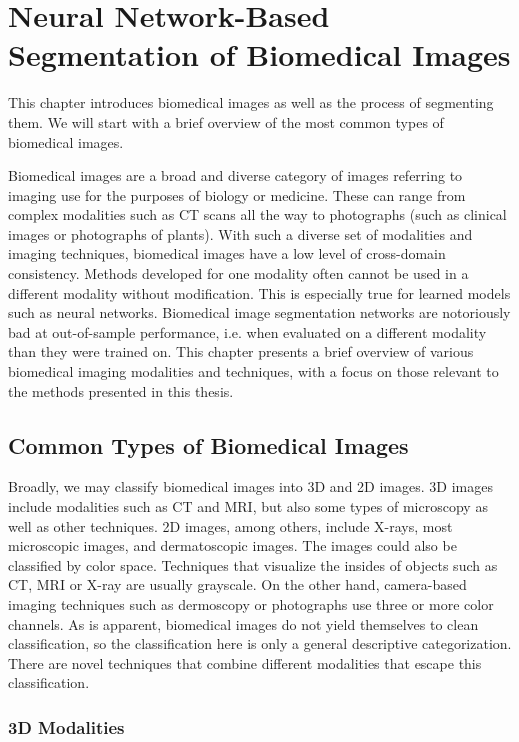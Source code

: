 \chapter{Neural Network-Based Segmentation of Biomedical Images}
\label{chap:seg-background}

This chapter introduces biomedical images as well as the process of segmenting them. We will start with a brief overview of the most common types of biomedical images.

Biomedical images are a broad and diverse category of images referring to imaging use for the purposes of biology or medicine. These can range from complex modalities such as CT scans all the way to photographs (such as clinical images or photographs of plants). With such a diverse set of modalities and imaging techniques, biomedical images have a low level of cross-domain consistency. Methods developed for one modality often cannot be used in a different modality without modification. This is especially true for learned models such as neural networks. Biomedical image segmentation networks are notoriously bad at out-of-sample performance, i.e. when evaluated on a different modality than they were trained on. This chapter presents a brief overview of various biomedical imaging modalities and techniques, with a focus on those relevant to the methods presented in this thesis.

\section{Common Types of Biomedical Images}

Broadly, we may classify biomedical images into 3D and 2D images. 3D images include modalities such as CT and MRI, but also some types of microscopy as well as other techniques. 2D images, among others, include X-rays, most microscopic images, and dermatoscopic images. The images could also be classified by color space. Techniques that visualize the insides of objects such as CT, MRI or X-ray are usually grayscale. On the other hand, camera-based imaging techniques such as dermoscopy or photographs use three or more color channels. As is apparent, biomedical images do not yield themselves to clean classification, so the classification here is only a general descriptive categorization. There are novel techniques that combine different modalities that escape this classification.

\subsection{3D Modalities}

